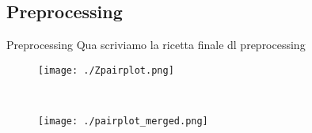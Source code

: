 \documentclass{beamer}
\begin{document}
\subsection{Preprocessing}
\begin{frame}{Preprocessing}
  Qua scriviamo la ricetta finale dl preprocessing

  \begin{figure}
    \parbox{.47\linewidth}{
      \centering
      \texttt{[image: ./Zpairplot.png]}
    }\,
    \parbox{.47\linewidth}{
      \centering
      \texttt{[image: ./pairplot\_merged.png]}
    }
  \end{figure}




\end{frame}
\end{document}
